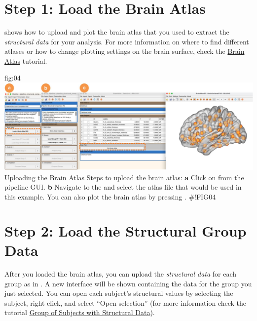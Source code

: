 \documentclass[justified]{tufte-handout}
\begin{document}
\section{Step 1: Load the Brain Atlas}
 shows how to upload and plot the brain atlas that you used to extract the \emph{structural data} for your analysis. For more information on where to find different atlases or how to change plotting settings on the brain surface, check the \href{https://github.com/braph-software/BRAPH-2/tree/develop/tutorials/general/tut_ba}{Brain Atlas} tutorial.

{fig:04}
{\includegraphics{fig04.jpg}
}
{Uploading the Brain Atlas}
{
	Steps to upload the brain atlas:
	{\bf a} Click on  from the pipeline GUI.
	{\bf b} Navigate to the  and select the atlas file  that would be used in this example. You can also plot the brain atlas by pressing . 
}
#!FIG04
 
\section{Step 2: Load the Structural Group Data}

After you loaded the brain atlas, you can upload the \emph{structural data} for each group as in . A new interface will be shown containing the data for the group you just selected. You can open each subject’s structural values by selecting the subject, right click, and select “Open selection” (for more information check the tutorial \href{https://github.com/braph-software/BRAPH-2/tree/develop/tutorials/general/tut_gr_st}{Group of Subjects with Structural Data}).	
\end{document}
